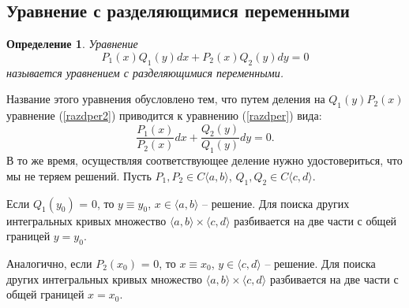 \documentclass[a4paper,14pt]{extarticle}
\newtheorem{definition}{Определение}[subsection]
\newcommand{\be}{\begin{equation}}
\newcommand{\ee}{\end{equation}}
\newcommand{\la}{\label}
\begin{document}
\subsection{Уравнение с разделяющимися переменными}
\begin{definition}
Уравнение 
\be\la{razdper2}
P_1(x)Q_1(y)dx + P_2(x)Q_2(y)dy = 0
\ee
называется уравнением с разделяющимися переменными.
\end{definition}
Название этого уравнения обусловлено тем, что путем деления на $Q_1(y)P_2(x)$ уравнение (\ref{razdper2}) приводится к уравнению (\ref{razdper}) вида:
$$
\frac{P_1(x)}{P_2(x)} dx + \frac{Q_2(y)}{Q_1(y)}dy = 0.
$$
В то же время, осуществляя соответствующее деление нужно удостовериться, что мы не теряем решений. Пусть $P_1, P_2 \in C \langle a, b \rangle$, $Q_1, Q_2 \in C \langle c, d \rangle$. 

Если $Q_1(y_0)$ = 0, то $y \equiv y_0$, $x \in \langle a, b \rangle$ -- решение. Для поиска других интегральных кривых множество $\langle a, b \rangle \times \langle c, d \rangle$ разбивается на две части с общей границей $y = y_0$.

Аналогично, если $P_2(x_0)$ = 0, то $x \equiv x_0$, $y \in \langle c, d \rangle$ -- решение. Для поиска других интегральных кривых множество $\langle a, b \rangle \times \langle c, d \rangle$ разбивается на две части с общей границей $x = x_0$.
\end{document}
